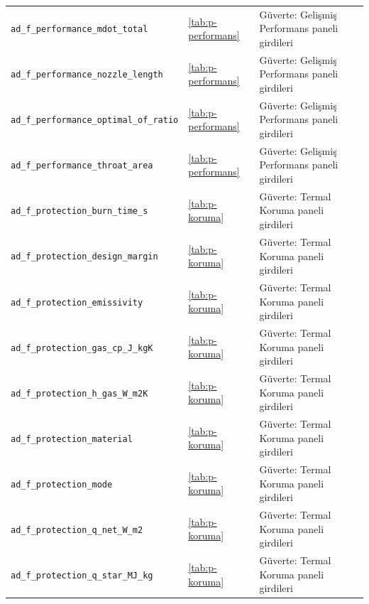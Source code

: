 \documentclass[11pt,a4paper]{article}
\begin{document}
{\begin{longtable}{@{}>{\raggedright\arraybackslash}p{5.2cm}p{1.4cm}>{\raggedright\arraybackslash}p{7.4cm}@{}}
\texttt{ad\_\allowbreak{}f\_\allowbreak{}performance\_\allowbreak{}mdot\_\allowbreak{}total} & \ref{tab:p-performans} & Güverte: Gelişmiş Performans paneli girdileri \\
\texttt{ad\_\allowbreak{}f\_\allowbreak{}performance\_\allowbreak{}nozzle\_\allowbreak{}length} & \ref{tab:p-performans} & Güverte: Gelişmiş Performans paneli girdileri \\
\texttt{ad\_\allowbreak{}f\_\allowbreak{}performance\_\allowbreak{}optimal\_\allowbreak{}of\_\allowbreak{}ratio} & \ref{tab:p-performans} & Güverte: Gelişmiş Performans paneli girdileri \\
\texttt{ad\_\allowbreak{}f\_\allowbreak{}performance\_\allowbreak{}throat\_\allowbreak{}area} & \ref{tab:p-performans} & Güverte: Gelişmiş Performans paneli girdileri \\
\texttt{ad\_\allowbreak{}f\_\allowbreak{}protection\_\allowbreak{}burn\_\allowbreak{}time\_\allowbreak{}s} & \ref{tab:p-koruma} & Güverte: Termal Koruma paneli girdileri \\
\texttt{ad\_\allowbreak{}f\_\allowbreak{}protection\_\allowbreak{}design\_\allowbreak{}margin} & \ref{tab:p-koruma} & Güverte: Termal Koruma paneli girdileri \\
\texttt{ad\_\allowbreak{}f\_\allowbreak{}protection\_\allowbreak{}emissivity} & \ref{tab:p-koruma} & Güverte: Termal Koruma paneli girdileri \\
\texttt{ad\_\allowbreak{}f\_\allowbreak{}protection\_\allowbreak{}gas\_\allowbreak{}cp\_\allowbreak{}J\_\allowbreak{}kgK} & \ref{tab:p-koruma} & Güverte: Termal Koruma paneli girdileri \\
\texttt{ad\_\allowbreak{}f\_\allowbreak{}protection\_\allowbreak{}h\_\allowbreak{}gas\_\allowbreak{}W\_\allowbreak{}m2K} & \ref{tab:p-koruma} & Güverte: Termal Koruma paneli girdileri \\
\texttt{ad\_\allowbreak{}f\_\allowbreak{}protection\_\allowbreak{}material} & \ref{tab:p-koruma} & Güverte: Termal Koruma paneli girdileri \\
\texttt{ad\_\allowbreak{}f\_\allowbreak{}protection\_\allowbreak{}mode} & \ref{tab:p-koruma} & Güverte: Termal Koruma paneli girdileri \\
\texttt{ad\_\allowbreak{}f\_\allowbreak{}protection\_\allowbreak{}q\_\allowbreak{}net\_\allowbreak{}W\_\allowbreak{}m2} & \ref{tab:p-koruma} & Güverte: Termal Koruma paneli girdileri \\
\texttt{ad\_\allowbreak{}f\_\allowbreak{}protection\_\allowbreak{}q\_\allowbreak{}star\_\allowbreak{}MJ\_\allowbreak{}kg} & \ref{tab:p-koruma} & Güverte: Termal Koruma paneli girdileri \\

\end{longtable}}
\end{document}
